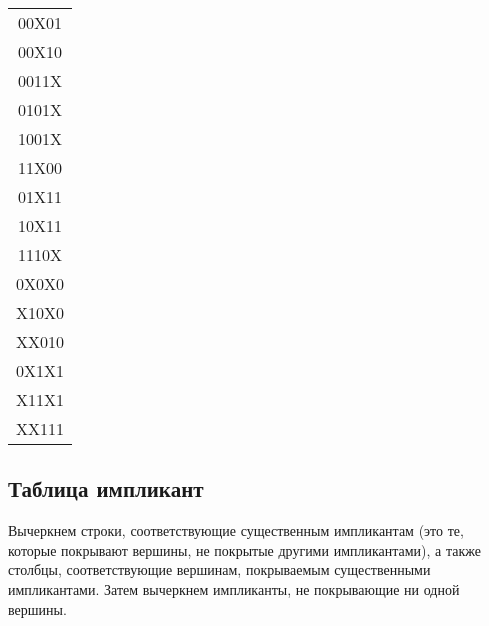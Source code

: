 \documentclass{article}
\begin{document}
\begin{center}
\begin{tabular}[t]{|c|}
00X01\\
00X10\\
0011X\\
0101X\\
1001X\\
11X00\\
01X11\\
10X11\\
1110X\\
0X0X0\\
X10X0\\
XX010\\
0X1X1\\
X11X1\\
XX111\\
\hline \end{tabular}
\end{center}
\subsection*{Таблица импликант}
Вычеркнем строки, соответствующие существенным импликантам (это те, которые покрывают вершины, не покрытые другими импликантами), а также столбцы, соответствующие вершинам, покрываемым существенными импликантами. Затем вычеркнем импликанты, не покрывающие ни одной вершины.
\end{document}
